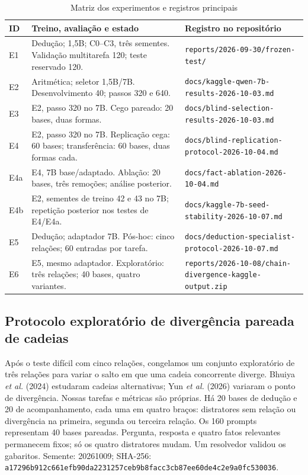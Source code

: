 \documentclass[12pt,a4paper]{article}
\begin{document}
\begin{table}[!ht]
\centering\caption{Matriz dos experimentos e registros principais}\label{tab:matrix}
\footnotesize
\begin{tabularx}{\linewidth}{p{0.5cm}p{4.8cm}X}
\toprule
ID & Treino, avaliação e estado & Registro no repositório \\
\midrule
E1 & Dedução; 1,5B; C0--C3, três sementes. Validação multitarefa 120; teste reservado 120. & \nolinkurl{reports/2026-09-30/frozen-test/} \\
E2 & Aritmética; seletor 1,5B/7B. Desenvolvimento 40; passos 320 e 640. & \nolinkurl{docs/kaggle-qwen-7b-results-2026-10-03.md} \\
E3 & E2, passo 320 no 7B. Cego pareado: 20 bases, duas formas. & \nolinkurl{docs/blind-selection-results-2026-10-03.md} \\
E4 & E2, passo 320 no 7B. Replicação cega: 60 bases; transferência: 60 bases, duas formas cada. & \nolinkurl{docs/blind-replication-protocol-2026-10-04.md} \\
E4a & E4, 7B base/adaptado. Ablação: 20 bases, três remoções; análise posterior. & \nolinkurl{docs/fact-ablation-2026-10-04.md} \\
E4b & E2, sementes de treino 42 e 43 no 7B; repetição posterior nos testes de E4/E4a. & \nolinkurl{docs/kaggle-7b-seed-stability-2026-10-07.md} \\
E5 & Dedução; adaptador 7B. Pós-hoc: cinco relações; 60 entradas por tarefa. & \nolinkurl{docs/deduction-specialist-protocol-2026-10-07.md} \\
E6 & E5, mesmo adaptador. Exploratório: três relações; 40 bases, quatro variantes. & \nolinkurl{reports/2026-10-08/chain-divergence-kaggle-output.zip} \\
\bottomrule
\end{tabularx}
\par{}
\end{table}

\subsection{Protocolo exploratório de divergência pareada de cadeias}
Após o teste difícil com cinco relações, congelamos um conjunto exploratório de três relações para variar o salto em que uma cadeia concorrente diverge. Bhuiya \textit{et al.} (2024) estudaram cadeias alternativas; Yun \textit{et al.} (2026) variaram o ponto de divergência. Nossas tarefas e métricas são próprias. Há 20 bases de dedução e 20 de acompanhamento, cada uma em quatro braços: distratores sem relação ou divergência na primeira, segunda ou terceira relação. Os 160 prompts representam 40 bases pareadas. Pergunta, resposta e quatro fatos relevantes permanecem fixos; só os quatro distratores mudam. Um resolvedor validou os gabaritos. Semente: 20261009; SHA-256: \nolinkurl{a17296b912c661efb90da2231257ceb9b8facc3cb87ee60de4c2e9a0fc530036}.
\end{document}
